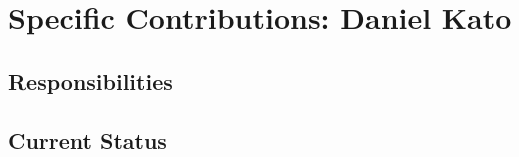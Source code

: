 \documentclass[onecolumn, draftclsnofoot,10pt, compsoc]{IEEEtran}
\begin{document}
%



%
\section{Specific Contributions: Daniel Kato}
\subsection{Responsibilities}
\subsection{Current Status}
\end{document}
